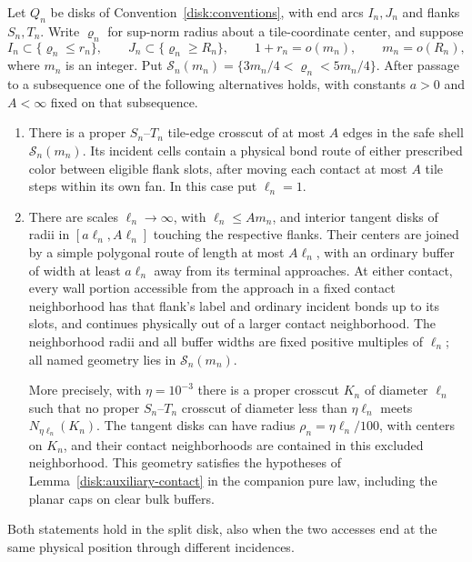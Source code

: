 \begin{proposition}
\label{hyp:disk-localization}
Let $Q_n$ be disks of Convention~\ref{disk:conventions}, with end arcs
$I_n,J_n$ and flanks $S_n,T_n$.  Write $\varrho_n$ for sup-norm radius
about a tile-coordinate center, and suppose
\[
 I_n\subset\{\varrho_n\le r_n\},\qquad
 J_n\subset\{\varrho_n\ge R_n\},\qquad
 1+r_n=o(m_n),\qquad m_n=o(R_n),
\]
where $m_n$ is an integer.  Put
$\mathcal S_n(m_n)=\{3m_n/4<\varrho_n<5m_n/4\}$.
After passage to a subsequence one of the following alternatives holds,
with constants $a>0$ and $A<\infty$ fixed on that subsequence.
\begin{enumerate}[label=\textup{(\roman*)}]
\item There is a proper $S_n$--$T_n$ tile-edge crosscut of at most $A$
edges in the safe shell $\mathcal S_n(m_n)$.  Its incident cells contain
a physical bond route of either prescribed color between eligible
flank slots, after moving each contact at most $A$ tile steps within
its own fan.  In this case put $\ell_n=1$.
\item There are scales $\ell_n\to\infty$, with $\ell_n\le A m_n$,
and interior tangent disks of radii in $[a\ell_n,A\ell_n]$ touching
the respective flanks.  Their centers are joined by a simple polygonal
route of length at most $A\ell_n$, with an ordinary buffer of width
at least $a\ell_n$ away from its terminal approaches.  At either
contact, every wall portion accessible from the approach in a fixed
contact neighborhood has that flank's label and ordinary incident
bonds up to its slots, and continues physically out of a larger
contact neighborhood.  The neighborhood radii and all buffer widths
are fixed positive multiples of $\ell_n$; all named geometry lies in
$\mathcal S_n(m_n)$.

More precisely, with $\eta=10^{-3}$ there is a proper crosscut $K_n$
of diameter $\ell_n$ such that no proper $S_n$--$T_n$ crosscut of
diameter less than $\eta\ell_n$ meets $N_{\eta\ell_n}(K_n)$.
The tangent disks can have radius $\rho_n=\eta\ell_n/100$, with
centers on $K_n$, and their contact neighborhoods are contained in
this excluded neighborhood.  This geometry satisfies the hypotheses
of Lemma~\ref{disk:auxiliary-contact} in the companion pure law,
including the planar caps on clear bulk buffers.
\end{enumerate}
Both statements hold in the split disk, also when the two accesses
end at the same physical position through different incidences.
\end{proposition}

